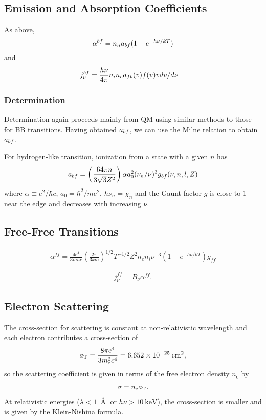 \subsection{Emission and Absorption Coefficients}

As above, 
\begin{align}
\alpha^{bf} = n_n a_{bf}(1 - e^{-h\nu/kT})
\end{align}
and
\begin{align}
j_\nu^{bf} &= \frac{h\nu}{4\pi} n_i n_e a_{fb}(v) f(v)
         v dv/d\nu
\end{align}

\subsubsection{Determination}

Determination again proceeds mainly from QM using similar
methods to those for BB transitions. Having obtained
$a_{bf}$, we can use the Milne relation to obtain
$a_{bf}$.

For hydrogen-like transition, ionization from a state with a
given $n$ has
\begin{align}
a_{bf} = \left(\frac{64\pi n}{3\sqrt{3} Z^2}\right)
\alpha a_0^2 (\nu_n/\nu)^3 g_{bf}(\nu, n, l, Z)
\end{align}
where $\alpha \equiv e^2/\hbar c$, $a_0 = \hbar^2/me^2$, $h\nu_n = \chi_n$ and the Gaunt factor $g$ is close to 1
near the edge and decreases with increasing $\nu$.

\subsection{Free-Free Transitions}

\begin{align}
\alpha^{ff} = 
\frac{4e^4}{3mhc}\left(\frac{2\pi}{3km}\right)^{1/2}
T^{-1/2} Z^2 n_e n_i \nu^{-3} (1 - e^{-h\nu/kT}) \bar g_{ff}
\end{align}

\begin{align}
j^{ff}_\nu = B_\nu \alpha^{ff}.
\end{align}

\subsection{Electron Scattering}

The cross-section for scattering is constant
at non-relativistic wavelength and each electron contributes
a cross-section of
\begin{align}
a_\mathrm{T} = 
\frac{8 \pi e^4}{3 m_\mathrm{e}^2 c^4} = 6.652 \times
10^{-25}\:\mathrm{cm^2},
\end{align}
so the scattering coefficient is given in terms of the free
electron density $n_\mathrm{e}$ by
\begin{align}
\sigma = n_\mathrm{e} a_\mathrm{T}.
\end{align}
At relativistic energies ($\lambda < 1\:\Angstrom$ or $h\nu
> 10\:\mathrm{keV}$), the cross-section is smaller and is
given by the Klein-Nishina formula. 

